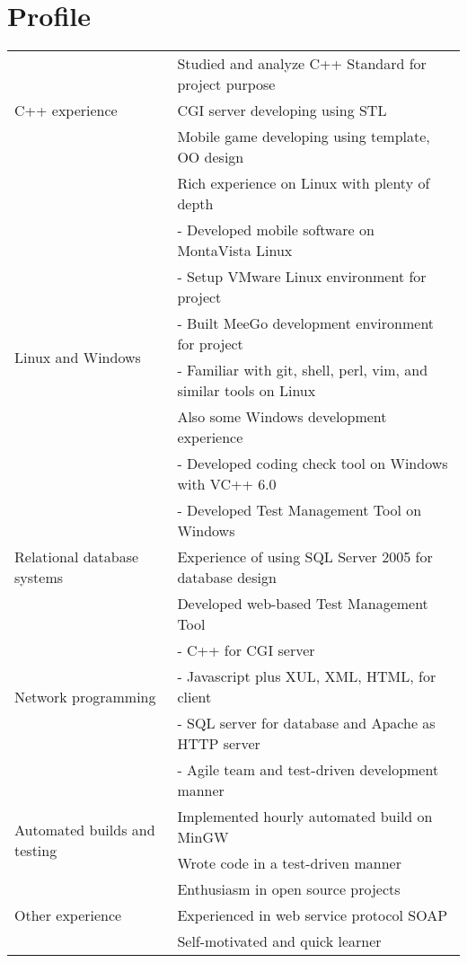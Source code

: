 \documentclass[a4paper,11pt]{article}
\begin{document}
\section*{Profile}
\begin{tabular}{ l  p{10cm} }
  \hline
  \multirow{3}{*}{C++ experience} 
  & Studied and analyze C++ Standard for project purpose \\ 
  & CGI server developing using STL \\
  & Mobile game developing using template, OO design \\

  \hline
  \multirow{8}{*}{Linux and Windows} 
  & Rich experience on Linux with plenty of depth \\
  & - Developed mobile software on MontaVista Linux \\
  & - Setup VMware Linux environment for project \\
  & - Built MeeGo development environment for project \\
  & - Familiar with git, shell, perl, vim, and similar tools on Linux \\
  & Also some Windows development experience \\
  & - Developed coding check tool on Windows with VC++ 6.0 \\
  & - Developed Test Management Tool on Windows \\

  \hline
  \multirow{1}{*}{Relational database systems}
  & Experience of using SQL Server 2005 for database design \\

  \hline
  \multirow{5}{*}{Network programming}
  & Developed web-based Test Management Tool \\
  & - C++ for CGI server \\
  & - Javascript plus XUL, XML, HTML, for client \\
  & - SQL server for database and Apache as HTTP server \\
  & - Agile team and test-driven development manner \\

  \hline
  \multirow{2}{*}{Automated builds and testing}
  & Implemented hourly automated build on MinGW \\
  & Wrote code in a test-driven manner \\

  \hline
  \multirow{3}{*}{Other experience}
  & Enthusiasm in open source projects \\
  & Experienced in web service protocol SOAP \\
  & Self-motivated and quick learner \\

  \hline
\end{tabular}
\end{document}
